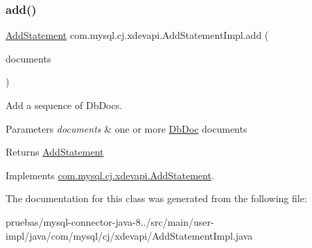\subsubsection{\texorpdfstring{add()}{add()}\hspace{0.1cm}{\footnotesize\ttfamily [2/2]}}
{\footnotesize\ttfamily \mbox{\hyperlink{interfacecom_1_1mysql_1_1cj_1_1xdevapi_1_1_add_statement}{Add\+Statement}} com.\+mysql.\+cj.\+xdevapi.\+Add\+Statement\+Impl.\+add (\begin{DoxyParamCaption}\item[{Db\+Doc...}]{documents }\end{DoxyParamCaption})}

Add a sequence of Db\+Docs.


\begin{DoxyParams}{Parameters}
{\em documents} & one or more \mbox{\hyperlink{interfacecom_1_1mysql_1_1cj_1_1xdevapi_1_1_db_doc}{Db\+Doc}} documents \\
\hline
\end{DoxyParams}
\begin{DoxyReturn}{Returns}
\mbox{\hyperlink{interfacecom_1_1mysql_1_1cj_1_1xdevapi_1_1_add_statement}{Add\+Statement}} 
\end{DoxyReturn}


Implements \mbox{\hyperlink{interfacecom_1_1mysql_1_1cj_1_1xdevapi_1_1_add_statement_a886e1294099cf00085c882aba48bf06e}{com.\+mysql.\+cj.\+xdevapi.\+Add\+Statement}}.



The documentation for this class was generated from the following file\+:\begin{DoxyCompactItemize}
\item 
pruebas/mysql-\/connector-\/java-\/8../src/main/user-\/impl/java/com/mysql/cj/xdevapi/Add\+Statement\+Impl.\+java\end{DoxyCompactItemize}
